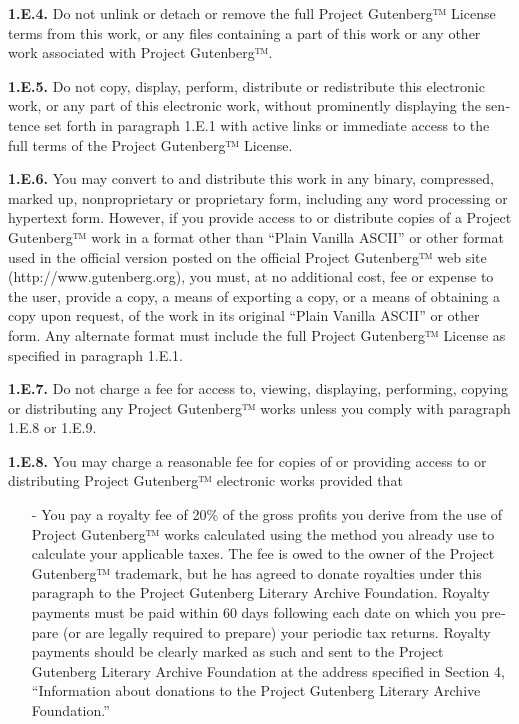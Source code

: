 \documentclass[a5paper]{book}
\begin{document}
\begin{german}
\begin{english}
\begin{pgfooter_env}
{\bfseries{1.E.4.}} Do not unlink or detach or remove the full Project
Gutenberg™ License terms from this work, or any files containing a
part of this work or any other work associated with Project
Gutenberg™.\par

{\bfseries{1.E.5.}} Do not copy, display, perform, distribute or redistribute
this electronic work, or any part of this electronic work, without
prominently displaying the sentence set forth in paragraph 1.E.1 with
active links or immediate access to the full terms of the Project
Gutenberg™ License.\par

{\bfseries{1.E.6.}} You may convert to and distribute this work in any binary,
compressed, marked up, nonproprietary or proprietary form, including
any word processing or hypertext form. However, if you provide access
to or distribute copies of a Project Gutenberg™ work in a format other
than “Plain Vanilla ASCII” or other format used in the official
version posted on the official Project Gutenberg™ web site
({http://www.gutenberg.org}), you must, at no additional cost, fee or
expense to the user, provide a copy, a means of exporting a copy, or a
means of obtaining a copy upon request, of the work in its original
“Plain Vanilla ASCII” or other form. Any alternate format must include
the full Project Gutenberg™ License as specified in paragraph 1.E.1.\par

{\bfseries{1.E.7.}} Do not charge a fee for access to, viewing, displaying,
performing, copying or distributing any Project Gutenberg™ works
unless you comply with paragraph 1.E.8 or 1.E.9.\par

{\bfseries{1.E.8.}} You may charge a reasonable fee for copies of or providing
access to or distributing Project Gutenberg™ electronic works provided
that\par

\begin{itemize}
\item[-] 
You pay a royalty fee of 20\% of the gross profits you derive from
the use of Project Gutenberg™ works calculated using the method you
already use to calculate your applicable taxes. The fee is owed to
the owner of the Project Gutenberg™ trademark, but he has agreed to
donate royalties under this paragraph to the Project Gutenberg
Literary Archive Foundation. Royalty payments must be paid within 60
days following each date on which you prepare (or are legally
required to prepare) your periodic tax returns. Royalty payments
should be clearly marked as such and sent to the Project Gutenberg
Literary Archive Foundation at the address specified in Section 4,
“Information about donations to the Project Gutenberg Literary
Archive Foundation.”\par


\end{itemize}
\end{pgfooter_env}
\end{english}
\end{german}
\end{document}
